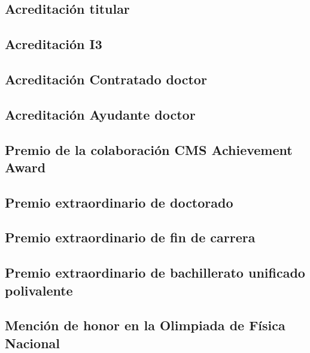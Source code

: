 \documentclass[a4paper, 11pt, twoside, openright]{report}
\begin{document}
\subsection{Acreditación titular}

\subsection{Acreditación I3}

\subsection{Acreditación Contratado doctor}

\subsection{Acreditación Ayudante doctor}

\subsection{Premio de la colaboración CMS Achievement Award}

\subsection{Premio extraordinario de doctorado}

\subsection{Premio extraordinario de fin de carrera}

\subsection{Premio extraordinario de bachillerato unificado polivalente}

\subsection{Mención de honor en la Olimpiada de Física Nacional}

\end{document}
